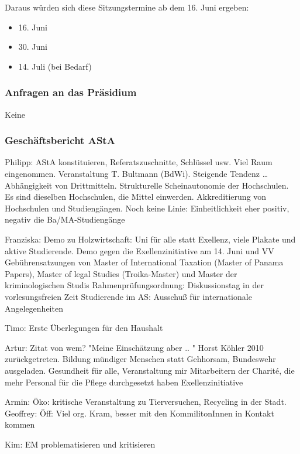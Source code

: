 \documentclass[ngerman,headheight=70pt]{scrartcl}
\begin{document}
    Daraus würden sich diese Sitzungstermine ab dem 16. Juni ergeben:
    \begin{itemize}
        \item 16. Juni
        \item 30. Juni
        \item 14. Juli (bei Bedarf)
    \end{itemize}

    \subsubsection{Anfragen an das Präsidium}

    Keine

    \subsubsection{Geschäftsbericht AStA}

    Philipp: AStA konstituieren, Referatszuschnitte, Schlüssel usw. Viel Raum
    eingenommen.
    Veranstaltung T. Bultmann (BdWi). Steigende Tendenz … Abhängigkeit von
    Drittmitteln. Strukturelle Scheinautonomie der Hochschulen. Es sind dieselben
    Hochschulen, die Mittel einwerden.
    Akkreditierung von Hochschulen und Studiengängen. Noch keine Linie:
    Einheitlichkeit eher positiv, negativ die Ba/MA-Studiengänge

    Franziska: Demo zu Holzwirtschaft: Uni für alle statt Exellenz, viele Plakate
    und aktive Studierende. Demo gegen die Exellenzinitiative am 14. Juni und VV
    Gebührensatzungen von Master of International Taxation (Master of Panama Papers),
    Master of legal Studies (Troika-Master) und Master der kriminologischen Studis
    Rahmenprüfungsordnung: Diskussionstag in der vorlesungsfreien Zeit
    Studierende im AS: Ausschuß für internationale Angelegenheiten

    Timo: Erste Überlegungen für den Haushalt

    Artur: Zitat von wem? "Meine Einschätzung aber .. " Horst Köhler 2010
    zurückgetreten. Bildung mündiger Menschen statt Gehhorsam, Bundeswehr ausgeladen.
    Gesundheit für alle, Veranstaltung mir Mitarbeitern der Charité, die mehr
    Personal für die Pflege durchgesetzt haben
    Exellenzinitiative

    Armin: Öko: kritische Veranstaltung zu Tierversuchen, Recycling in der Stadt.
    Geoffrey: Öff: Viel org. Kram, besser mit den KommilitonInnen in Kontakt kommen

    Kim: EM problematisieren und kritisieren
\end{document}
